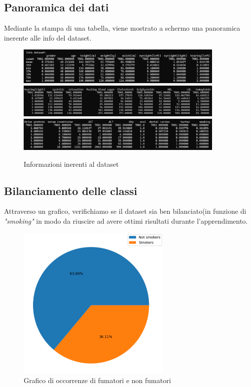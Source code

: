 \documentclass{article}
\begin{document}
\subsection{Panoramica dei dati}
Mediante la stampa di una tabella, viene mostrato a schermo una panoramica inerente alle info del dataset.\\
\begin{figure}[H]
        \includegraphics[width=0.9\textwidth]{info1}
        \includegraphics[width=0.9\textwidth]{info2}
        \includegraphics[width=0.9\textwidth]{info3}
        \centering
        \caption{Informazioni inerenti al dataset}
        \centering
\end{figure}

\subsection{Bilanciamento delle classi}
Attraverso un grafico, verifichiamo se il dataset sia ben bilanciato(in funzione di \textit{"smoking"} in modo da riuscire ad avere ottimi risultati durante l'apprendimento.

\begin{figure}[H]
        \includegraphics[width=7.5cm]{grafico1}
        \centering
        \caption{Grafico di occorrenze di fumatori e non fumatori}
        \centering
\end{figure}
\end{document}
